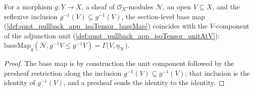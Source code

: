 \begin{lemma}
  \label{lem:quot_baseMap_le_refl}
  \leanok
  For a morphism \(g : Y \to X\), a sheaf of \(\mathcal O_X\)-modules
  \(\mathcal N\), an open \(V \subseteq X\), and the reflexive inclusion
  \(g^{-1}(V) \subseteq g^{-1}(V)\), the section-level base map
  (\cref{def:quot_pullback_app_isoTensor_baseMap}) coincides with the
  \(V\)-component of the adjunction unit
  (\cref{def:quot_pullback_app_isoTensor_unitAtV}):
  \(\mathrm{baseMap}_g(\mathcal N, g^{-1}V \le g^{-1}V)
    = \Gamma\bigl(V, \eta_{\mathcal N}\bigr)\).
\end{lemma}
\begin{proof}\leanok
  The base map is by construction the unit component followed by the
  presheaf restriction along the inclusion \(g^{-1}(V) \subseteq g^{-1}(V)\);
  that inclusion is the identity of \(g^{-1}(V)\), and a presheaf sends the
  identity to the identity.
\end{proof}

